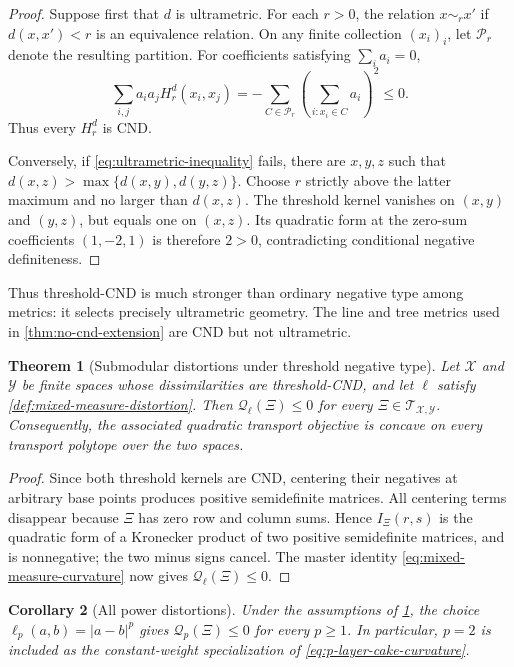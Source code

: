 \documentclass[11pt,a4paper]{article}
\newtheorem{theorem}{Theorem}[section]
\newtheorem{corollary}[theorem]{Corollary}
\theoremstyle{definition}
\theoremstyle{remark}
\newcommand{\Tcal}{\mathcal T}
\newcommand{\Qcal}{\mathcal Q}
\newcommand{\abs}[1]{\left\lvert #1\right\rvert}
\begin{document}
\begin{proof}
Suppose first that \(d\) is ultrametric.  For each \(r>0\), the relation
\(x\sim_r x'\) if \(d(x,x')<r\) is an equivalence relation.  On any finite
collection \((x_i)_i\), let \(\mathscr P_r\) denote the resulting partition.
For coefficients satisfying \(\sum_i a_i=0\),
\[
  \sum_{i,j}a_i a_jH_r^d(x_i,x_j)
  =-\sum_{C\in\mathscr P_r}\left(\sum_{i:x_i\in C}a_i\right)^2\leq0.
\]
Thus every \(H_r^d\) is CND.

Conversely, if \eqref{eq:ultrametric-inequality} fails, there are
\(x,y,z\) such that
\(d(x,z)>\max\{d(x,y),d(y,z)\}\).  Choose \(r\) strictly above the latter
maximum and no larger than \(d(x,z)\).  The threshold kernel vanishes on
\((x,y)\) and \((y,z)\), but equals one on \((x,z)\).  Its quadratic form at
the zero-sum coefficients \((1,-2,1)\) is therefore \(2>0\), contradicting
conditional negative definiteness.
\end{proof}

Thus threshold-CND is much stronger than ordinary negative type among metrics:
it selects precisely ultrametric geometry.  The line and tree metrics used in
\cref{thm:no-cnd-extension} are CND but not ultrametric.

\begin{theorem}[Submodular distortions under threshold negative type]
\label{thm:threshold-concavity}
Let \(\mathcal X\) and \(\mathcal Y\) be finite spaces whose dissimilarities are
threshold-CND, and let \(\ell\) satisfy
\cref{def:mixed-measure-distortion}.  Then
\(\Qcal_\ell(\Xi)\leq0\) for every
\(\Xi\in\Tcal_{\mathcal X,\mathcal Y}\).  Consequently, the associated
quadratic transport objective is concave on every transport polytope over the
two spaces.
\end{theorem}

\begin{proof}
Since both threshold kernels are CND, centering their negatives at arbitrary
base points produces positive semidefinite matrices.  All centering terms
disappear because \(\Xi\) has zero row and column sums.  Hence
\(I_\Xi(r,s)\) is the quadratic form of a Kronecker product of two positive
semidefinite matrices, and is nonnegative; the two minus signs cancel.
The master identity \eqref{eq:mixed-measure-curvature} now gives
\(\Qcal_\ell(\Xi)\leq0\).
\end{proof}

\begin{corollary}[All power distortions]
\label{cor:power-distortions}
Under the assumptions of \cref{thm:threshold-concavity}, the choice
\(\ell_p(a,b)=\abs{a-b}^p\) gives
\(\Qcal_p(\Xi)\leq0\) for every \(p\geq1\).  In particular, \(p=2\) is
included as the constant-weight specialization of
\eqref{eq:p-layer-cake-curvature}.
\end{corollary}
\end{document}

